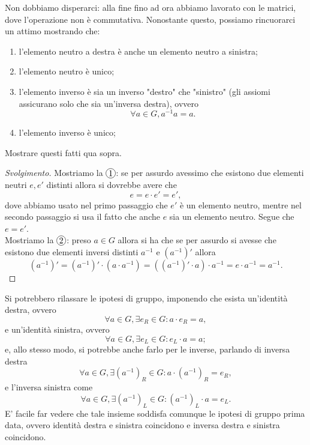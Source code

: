 Non dobbiamo disperarci: alla fine fino ad ora abbiamo lavorato con le matrici, dove l'operazione non è commutativa. Nonostante questo, possiamo rincuorarci un attimo mostrando che:
\begin{enumerate}[label=\protect\circled{\arabic*}]
    \item l'elemento neutro a destra è anche un elemento neutro a sinistra;
    \item l'elemento neutro è unico;
    \item l'elemento inverso è sia un inverso "destro" che "sinistro" (gli assiomi assicurano solo che sia un'inversa destra), ovvero
    $$
        \forall a \in G, a^{-1} a = a.
    $$
    \item l'elemento inverso è unico;
\end{enumerate}
\begin{exercise}[facoltativo]
    Mostrare questi fatti qua sopra.
\end{exercise}
\begin{proof}[Svolgimento]
    Mostriamo la $\circled{1}$: se per assurdo avessimo che esistono due elementi neutri $e, e'$ distinti allora si dovrebbe avere che
    $$
    e = e \cdot e' = e',
    $$
    dove abbiamo usato nel primo passaggio che $e'$ è un elemento neutro, mentre nel secondo passaggio si usa il fatto che anche $e$ sia un elemento neutro. Segue che $e = e'$. \\   
    Mostriamo la $\circled{2}$: preso $a \in G$ allora si ha che se per assurdo si avesse che esistono due elementi inversi distinti $a^{-1}$ e $(a^{-1})'$ allora
    $$
        (a^{-1})' = (a^{-1})' \cdot (a \cdot a^{-1}) = ((a^{-1})' \cdot a) \cdot a^{-1} = e \cdot a^{-1} = a^{-1}.
    $$
\end{proof}
\begin{remark}
    Si potrebbero rilassare le ipotesi di gruppo, imponendo che esista un'identità destra, ovvero
    $$
        \forall a \in G, \exists e_R \in G: a \cdot e_R = a,
    $$
    e un'identità sinistra, ovvero
    $$
        \forall a \in G, \exists e_L \in G: e_L \cdot a = a;
    $$
    e, allo stesso modo, si potrebbe anche farlo per le inverse, parlando di inversa destra
    $$
        \forall a \in G, \exists (a^{-1})_R \in G : a \cdot (a^{-1})_R = e_R,
    $$
    e l'inversa sinistra come
    $$
        \forall a \in G, \exists (a^{-1})_L \in G : (a^{-1})_L \cdot a = e_L.
    $$
    E' facile far vedere che tale insieme soddisfa comunque le ipotesi di gruppo prima data, ovvero identità destra e sinistra coincidono e inversa destra e sinistra coincidono.
\end{remark}
